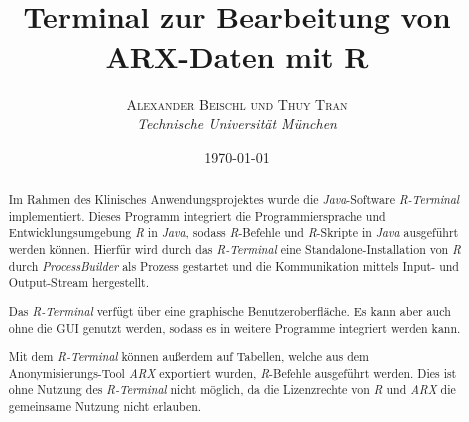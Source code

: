 \documentclass[a4paper, 12pt]{report} %
\title{\textbf{}\\ %
Terminal zur Bearbeitung von ARX-Daten mit R} %
\author{\textsc{Alexander Beischl und Thuy Tran} %
\\{\textit{Technische Universität München}}} %
\date{\today} %
\makeatletter
\renewcommand{\maketitle}{ %
\begin{flushright} %
{\LARGE\@title} %

\vspace{50pt} %

{\large\@author} %
\\\@date %

\vspace{40pt} %
\end{flushright}
}
\makeatother
\begin{document}
\renewcommand\lstlistingname{R-Befehl}

\maketitle %


\renewcommand{\abstractname}{Zusammenfassung} %

\begin{abstract}
Im Rahmen des Klinisches Anwendungsprojektes wurde die \textit{Java}-Software \textit{R-Terminal} implementiert. Dieses Programm integriert die Programmiersprache und Entwicklungsumgebung \textit{R} in \textit{Java}, sodass \textit{R}-Befehle und \textit{R}-Skripte in \textit{Java} ausgeführt werden können. Hierfür wird durch das \textit{R-Terminal} eine Standalone-Installation von \textit{R} durch \textit{ProcessBuilder} als Prozess gestartet und die Kommunikation mittels Input- und Output-Stream hergestellt.

Das \textit{R-Terminal} verfügt über eine graphische Benutzeroberfläche. Es kann aber auch ohne die GUI genutzt werden, sodass es in weitere Programme integriert werden kann.

Mit dem \textit{R-Terminal} können außerdem auf Tabellen, welche aus dem  Anonymisierungs-Tool \textit{ARX} exportiert wurden, \textit{R}-Befehle ausgeführt werden. Dies ist ohne Nutzung des \textit{R-Terminal} nicht möglich, da die Lizenzrechte von \textit{R} und \textit{ARX} die gemeinsame Nutzung nicht erlauben.

\end{abstract}


\vspace{30pt} %
\end{document}
